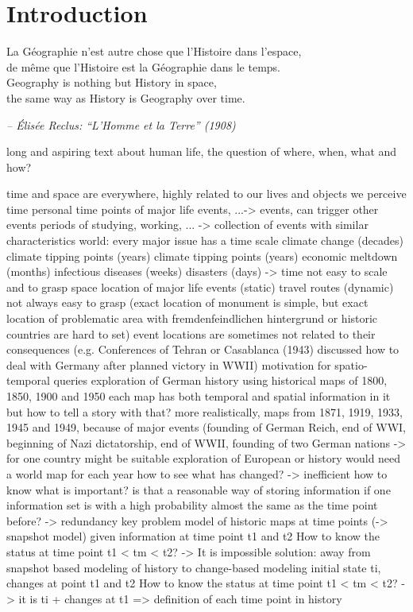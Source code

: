 
\chapter{Introduction} %
\label{cha:introduction}

\begin{quoteit}
\large
La Géographie n’est autre chose que l’Histoire dans l’espace, \\
de même que l’Histoire est la Géographie dans le temps. \\

Geography is nothing but History in space, \\
the same way as History is Geography over time.
\end{quoteit}
\hfill \textit{-- Élisée Reclus: ``L'Homme et la Terre'' (1908)}

long and aspiring text about human life, the question of where, when, what and how?


time and space are everywhere, highly related to our lives and objects we perceive
time
  personal
    time points of major life events, ...-> events, can trigger other events
    periods of studying, working, ... -> collection of events with similar characteristics
  world: every major issue has a time scale
    climate change (decades)
    climate tipping points (years) climate tipping points (years)
    economic meltdown (months)
    infectious diseases (weeks)
    disasters (days)
  -> time not easy to scale and to grasp
space
  location of major life events (static)
  travel routes (dynamic)
  not always easy to grasp (exact location of monument is simple, but exact location of problematic area with fremdenfeindlichen hintergrund or historic countries are hard to set)
  event locations are sometimes not related to their consequences (e.g. Conferences of Tehran or Casablanca (1943) discussed how to deal with Germany after planned victory in WWII)
motivation for spatio-temporal queries
  exploration of German history using historical maps of 1800, 1850, 1900 and 1950
    each map has both temporal and spatial information in it
    but how to tell a story with that?
    more realistically, maps from 1871, 1919, 1933, 1945 and 1949, because of major events (founding of German Reich, end of WWI, beginning of Nazi dictatorship, end of WWII, founding of two German nations
    -> for one country might be suitable
  exploration of European or history
    would need a world map for each year
    how to see what has changed? -> inefficient
    how to know what is important?
    is that a reasonable way of storing information if one information set is with a high probability almost the same as the time point before? -> redundancy
  key problem
    model of historic maps at time points (-> snapshot model)
    given information at time point t1 and t2
    How to know the status at time point t1 < tm < t2?
    -> It is impossible
  solution: away from snapshot based modeling of history to change-based modeling
    initial state ti, changes at point t1 and t2
    How to know the status at time point t1 < tm < t2?
    -> it is ti + changes at t1
    => definition of each time point in history

